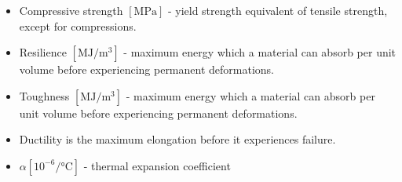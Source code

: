 \begin{itemize}
\begin{itemize}
        \item Compressive strength  $[\si{\mega\pascal}]$ - yield strength equivalent of tensile strength, except for compressions.
        \item Resilience $[\si{\mega\joule\per\meter\cubed}]$ - maximum energy which a material can absorb per unit volume before experiencing permanent deformations.
        \item Toughness $[\si{\mega\joule\per\meter\cubed}]$ - maximum energy which a material can absorb per unit volume before experiencing permanent deformations.
        \item Ductility is the maximum elongation before it experiences failure.
        \item $\alpha[10^{-6} \si{\per\celsius}]$ - thermal expansion coefficient
    \end{itemize}
\end{itemize}